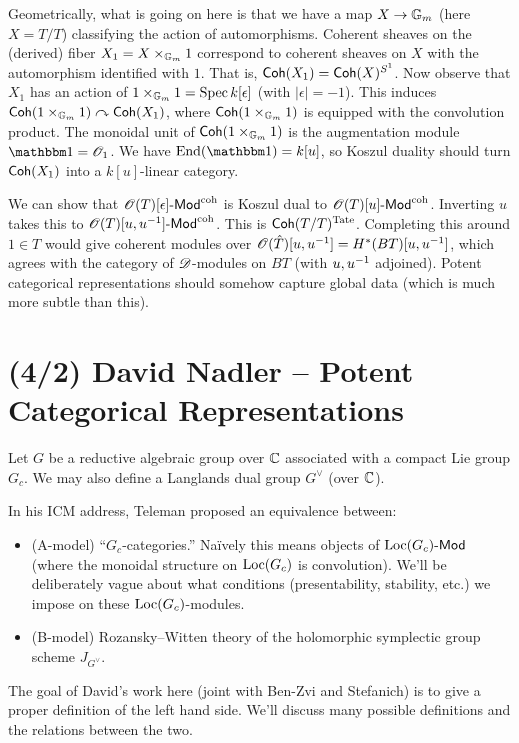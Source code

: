 \documentclass{article}
\begin{document}
Geometrically, what is going on here is that we have a map $X \to \mathbb{G}_m$ (here $X = T / T$) classifying the action of automorphisms.
Coherent sheaves on the (derived) fiber $X_1 = X \times_{\mathbb{G}_m} 1$ correspond to coherent sheaves on $X$ with the automorphism identified with $1$.
That is, $\mathsf{Coh}(X_1) = \mathsf{Coh}(X)^{S^1}$.
Now observe that $X_1$ has an action of $1 \times_{\mathbb{G}_m} 1 = \operatorname{Spec} k[\epsilon]$ (with $|\epsilon| = -1$).
This induces $\mathsf{Coh}(1 \times_{\mathbb{G}_m} 1) \curvearrowright \mathsf{Coh}(X_1)$, where $\mathsf{Coh}(1 \times_{\mathbb{G}_m} 1)$ is equipped with the convolution product.
The monoidal unit of $\mathsf{Coh}(1 \times_{\mathbb{G}_m} 1)$ is the augmentation module $\onebb = \Osc_1$.
We have $\End(\onebb) = k[u]$, so Koszul duality should turn $\mathsf{Coh}(X_1)$ into a $k[u]$-linear category.

\begin{ex}
  We can show that $\mathscr{O}(T)[\epsilon]\text{-}\mathsf{Mod}^{\mathrm{coh}}$ is Koszul dual to $\mathscr{O}(T)[u]\text{-}\mathsf{Mod}^{\mathrm{coh}}$.
  Inverting $u$ takes this to $\mathscr{O}(T)[u, u^{-1}]\text{-}\mathsf{Mod}^{\mathrm{coh}}$.
  This is $\mathsf{Coh}(T / T)^{\mathrm{Tate}}$.
  Completing this around $1 \in T$ would give coherent modules over $\mathscr{O}(\hat{T})[u, u^{-1}] = H^*(BT)[u, u^{-1}]$, which agrees with the category of $\mathscr{D}$-modules on $BT$ (with $u, u^{-1}$ adjoined).
  Potent categorical representations should somehow capture global data (which is much more subtle than this).
\end{ex}

\section{(4/2) David Nadler -- Potent Categorical Representations}

Let $G$ be a reductive algebraic group over $\mathbb{C}$ associated with a compact Lie group $G_c$.
We may also define a Langlands dual group $G^\vee$ (over $\mathbb{C}$).

In his ICM address, Teleman proposed an equivalence between:
\begin{itemize}
  \item (A-model) ``$G_c$-categories.''
    Na\"ively this means objects of $\operatorname{Loc}(G_c)\text{-}\mathsf{Mod}$ (where the monoidal structure on $\operatorname{Loc}(G_c)$ is convolution).
    We'll be deliberately vague about what conditions (presentability, stability, etc.) we impose on these $\operatorname{Loc}(G_c)$-modules.
  \item (B-model) Rozansky--Witten theory of the holomorphic symplectic group scheme $J_{G^\vee}$.
\end{itemize}
The goal of David's work here (joint with Ben-Zvi and Stefanich) is to give a proper definition of the left hand side.
We'll discuss many possible definitions and the relations between the two.
\end{document}
